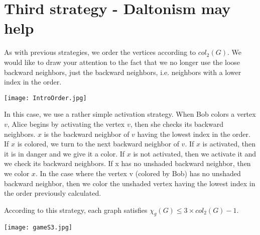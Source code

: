 \section{Third strategy - Daltonism may help}

As with previous strategies, we order the vertices according to $col_{2}(G)$.
We would like to draw your attention to the fact that we no longer use the loose backward neighbors, just the backward neighbors, i.e. neighbors with a lower index in the order.

\texttt{[image: IntroOrder.jpg]}

In this case, we use a rather simple activation strategy.
When Bob colors a vertex $v$, Alice begins by activating the vertex $v$, then she checks its backward neighbors.
$x$ is the backward neighbor of $v$ having the lowest index in the order.
If $x$ is colored, we turn to the next backward neighbor of $v$. If $x$ is activated, then it is in danger and we give it a color. If $x$ is not activated, then we activate it and we check its backward neighbors. If x has no unshaded backward neighbor, then we color $x$.
In the case where the vertex v (colored by Bob) has no unshaded backward neighbor, then we color the unshaded vertex having the lowest index in the order previously calculated.


According to this strategy, each graph satisfies $\chi_{g}(G) \leq 3 \times col_{2}(G) - 1$.

\texttt{[image: gameS3.jpg]}